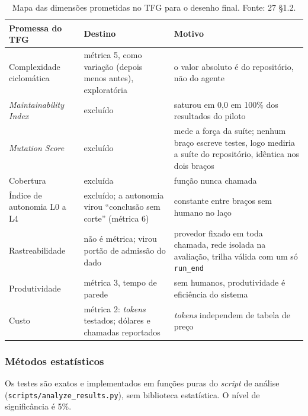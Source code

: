 \begin{table}[t]
\centering
\caption{Mapa das dimensões prometidas no TFG para o desenho final. Fonte: 27 \S1.2.}
\label{tab-tfg}
\small
\begin{tabular}{p{3.6cm}p{5.2cm}p{6.6cm}}
\toprule
Promessa do TFG & Destino & Motivo \\
\midrule
Complexidade ciclomática & métrica 5, como variação (depois menos antes), exploratória & o valor absoluto é do repositório, não do agente \\
\textit{Maintainability Index} & excluído & saturou em 0,0 em 100\% dos resultados do piloto \\
\textit{Mutation Score} & excluído & mede a força da suíte; nenhum braço escreve testes, logo mediria a suíte do repositório, idêntica nos dois braços \\
Cobertura & excluída & função nunca chamada \\
Índice de autonomia L0 a L4 & excluído; a autonomia virou ``conclusão sem corte'' (métrica 6) & constante entre braços sem humano no laço \\
Rastreabilidade & não é métrica; virou portão de admissão do dado & provedor fixado em toda chamada, rede isolada na avaliação, trilha válida com um só \texttt{run\_end} \\
Produtividade & métrica 3, tempo de parede & sem humanos, produtividade é eficiência do sistema \\
Custo & métrica 2: \textit{tokens} testados; dólares e chamadas reportados & \textit{tokens} independem de tabela de preço \\
\bottomrule
\end{tabular}
\end{table}

\subsubsection{Métodos estatísticos}

Os testes são exatos e implementados em funções puras do \textit{script} de análise (\texttt{scripts/analyze\_results.py}), sem biblioteca estatística. O nível de significância é 5\%.

